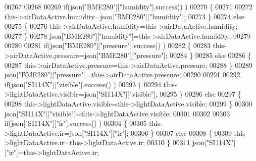 \begin{DoxyCode}
00267             
00268             
00269             \textcolor{keywordflow}{if}(json[\textcolor{stringliteral}{"BME280"}][\textcolor{stringliteral}{"humidity"}].success() )
00270             \{           
00271             
00272                 this->airDataActive.humidity=json[\textcolor{stringliteral}{"BME280"}][\textcolor{stringliteral}{"humidity"}];
00273             \}
00274             \textcolor{keywordflow}{else}
00275             \{
00276                 this->airDataActive.humidity=this->airDataActive.humidity;
00277             \}
00278             json[\textcolor{stringliteral}{"BME280"}][\textcolor{stringliteral}{"humidity"}]=this->airDataActive.humidity;
00279             
00280             
00281             \textcolor{keywordflow}{if}(json[\textcolor{stringliteral}{"BME280"}][\textcolor{stringliteral}{"pressure"}].success() )
00282             \{
00283                 this->airDataActive.pressure=json[\textcolor{stringliteral}{"BME280"}][\textcolor{stringliteral}{"pressure"}];
00284             \}
00285             \textcolor{keywordflow}{else}
00286             \{
00287                 this->airDataActive.pressure=this->airDataActive.pressure;
00288             \}
00289             json[\textcolor{stringliteral}{"BME280"}][\textcolor{stringliteral}{"pressure"}]=this->airDataActive.pressure;
00290 
00291             
00292             \textcolor{keywordflow}{if}(json[\textcolor{stringliteral}{"SI114X"}][\textcolor{stringliteral}{"visible"}].success() )
00293             \{
00294                 this->lightDataActive.visible=json[\textcolor{stringliteral}{"SI114X"}][\textcolor{stringliteral}{"visible"}];
00295             \}
00296             \textcolor{keywordflow}{else}
00297             \{
00298                 this->lightDataActive.visible=this->lightDataActive.visible;
00299             \}
00300             json[\textcolor{stringliteral}{"SI114X"}][\textcolor{stringliteral}{"visible"}]=this->lightDataActive.visible;
00301             
00302             
00303             \textcolor{keywordflow}{if}(json[\textcolor{stringliteral}{"SI114X"}][\textcolor{stringliteral}{"ir"}].success() )
00304             \{           
00305                 this->lightDataActive.ir=json[\textcolor{stringliteral}{"SI114X"}][\textcolor{stringliteral}{"ir"}];
00306             \}
00307             \textcolor{keywordflow}{else}
00308             \{
00309                 this->lightDataActive.ir=this->lightDataActive.ir;
00310             \}
00311             json[\textcolor{stringliteral}{"SI114X"}][\textcolor{stringliteral}{"ir"}]=this->lightDataActive.ir;

\end{DoxyCode}
